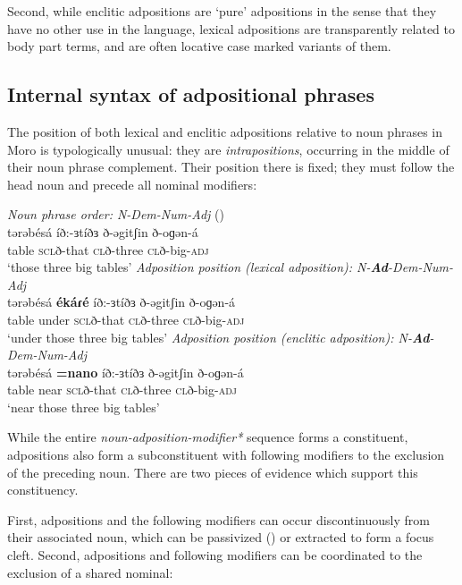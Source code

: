 Second, while enclitic adpositions are `pure' adpositions in the sense that they have no other use in the language, lexical adpositions are transparently related to body part terms, and are often locative case marked variants of them.
 

\subsection{Internal syntax of adpositional phrases}\label{sec:ch13:adsyntax}

The position of both lexical and enclitic adpositions relative to noun phrases in Moro is typologically unusual: they are \textit{intrapositions}, occurring in the middle of their noun phrase complement. Their position there is fixed; they must follow the head noun and precede all nominal modifiers:

\ea \ea \textit{Noun phrase order: 
		N-Dem-Num-Adj} ()\\
\gll 	tərəbésá	íð:-ɜtíðɜ   ð-əgitʃin ð-oɡən-á \\
		table	\textsc{scl}ð-that \textsc{cl}ð-three \textsc{cl}ð-big-\textsc{adj} \\
\glt `those three big tables' 
	\ex \textit{Adposition position (lexical adposition): 
		N-\textbf{Ad}-Dem-Num-Adj}\\ \label{ex:ch13:under}
\gll 	tərəbésá	\textbf{ékáɾé}	íð:-ɜtíðɜ   ð-əgitʃin ð-oɡən-á \\
		table	under	\textsc{scl}ð-that \textsc{cl}ð-three \textsc{cl}ð-big-\textsc{adj} \\
\glt `under those three big tables' 
	\ex \textit{Adposition position (enclitic adposition): 
		N-\textbf{Ad}-Dem-Num-Adj}\\
\gll 	tərəbésá	\textbf{=nano}	íð:-ɜtíðɜ   ð-əgitʃin ð-oɡən-á \\
		table	near	\textsc{scl}ð-that \textsc{cl}ð-three \textsc{cl}ð-big-\textsc{adj} \\
\glt `near those three big tables' 
\z 
\z 

While the entire \textit{noun-adposition-modifier*} sequence forms a constituent, adpositions also form a subconstituent with following modifiers to the exclusion of the preceding noun. There are two pieces of evidence which support this constituency. 

First, adpositions and the following modifiers can occur discontinuously from their associated noun, which can be passivized () or extracted to form a focus cleft. %
Second, adpositions and following modifiers can be coordinated to the exclusion of a shared nominal:

